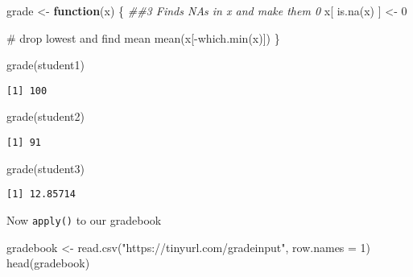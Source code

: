 \documentclass[
  letterpaper,
  DIV=11,
  numbers=noendperiod]{scrartcl}
\newenvironment{Shaded}{\begin{snugshade}}{\end{snugshade}}
\newcommand{\AttributeTok}[1]{\textcolor[rgb]{0.40,0.45,0.13}{#1}}
\newcommand{\CommentTok}[1]{\textcolor[rgb]{0.37,0.37,0.37}{#1}}
\newcommand{\ControlFlowTok}[1]{\textcolor[rgb]{0.00,0.23,0.31}{\textbf{#1}}}
\newcommand{\DecValTok}[1]{\textcolor[rgb]{0.68,0.00,0.00}{#1}}
\newcommand{\DocumentationTok}[1]{\textcolor[rgb]{0.37,0.37,0.37}{\textit{#1}}}
\newcommand{\FunctionTok}[1]{\textcolor[rgb]{0.28,0.35,0.67}{#1}}
\newcommand{\NormalTok}[1]{\textcolor[rgb]{0.00,0.23,0.31}{#1}}
\newcommand{\OtherTok}[1]{\textcolor[rgb]{0.00,0.23,0.31}{#1}}
\newcommand{\SpecialCharTok}[1]{\textcolor[rgb]{0.37,0.37,0.37}{#1}}
\newcommand{\StringTok}[1]{\textcolor[rgb]{0.13,0.47,0.30}{#1}}
\begin{document}
\begin{Shaded}
\begin{Highlighting}[]
\NormalTok{grade }\OtherTok{\textless{}{-}} \ControlFlowTok{function}\NormalTok{(x) \{}
  \DocumentationTok{\#\#3 Finds NAs in \textquotesingle{}x\textquotesingle{} and make them 0}
\NormalTok{x[ }\FunctionTok{is.na}\NormalTok{(x) ] }\OtherTok{\textless{}{-}} \DecValTok{0}

  \CommentTok{\# drop lowest and find mean}
\FunctionTok{mean}\NormalTok{(x[}\SpecialCharTok{{-}}\FunctionTok{which.min}\NormalTok{(x)])}
\NormalTok{\}}
\end{Highlighting}
\end{Shaded}

\begin{Shaded}
\begin{Highlighting}[]
\FunctionTok{grade}\NormalTok{(student1)}
\end{Highlighting}
\end{Shaded}

\begin{verbatim}
[1] 100
\end{verbatim}

\begin{Shaded}
\begin{Highlighting}[]
\FunctionTok{grade}\NormalTok{(student2)}
\end{Highlighting}
\end{Shaded}

\begin{verbatim}
[1] 91
\end{verbatim}

\begin{Shaded}
\begin{Highlighting}[]
\FunctionTok{grade}\NormalTok{(student3)}
\end{Highlighting}
\end{Shaded}

\begin{verbatim}
[1] 12.85714
\end{verbatim}

Now \texttt{apply()} to our gradebook

\begin{Shaded}
\begin{Highlighting}[]
\NormalTok{gradebook }\OtherTok{\textless{}{-}} \FunctionTok{read.csv}\NormalTok{(}\StringTok{"https://tinyurl.com/gradeinput"}\NormalTok{, }\AttributeTok{row.names =} \DecValTok{1}\NormalTok{)}
\FunctionTok{head}\NormalTok{(gradebook)}
\end{Highlighting}
\end{Shaded}
\end{document}
